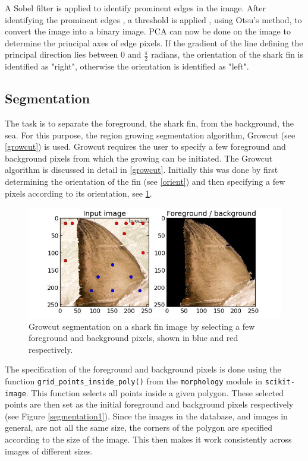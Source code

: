 \documentclass[a4paper,10pt]{article}
\begin{document}
A Sobel filter is applied 
to identify prominent edges in the image.  After identifying the prominent edges
, a threshold is applied , using Otsu's method, to convert the image into a binary image.
PCA can now be done on
the image to determine the principal axes of edge pixels.  If the gradient
of the line defining the principal direction lies between 0 and
$\frac{\pi}{2}$ radians, the orientation of the shark fin is
identified as
"right", otherwise the orientation is identified as "left". 

\subsection{Segmentation}
\label{segmentation}
The task is to separate the foreground, the shark fin, from the background,
the sea.  For this purpose, the region growing segmentation algorithm,
Growcut (see \ref{growcut}) is used.  Growcut requires the user to specify a few
foreground and background pixels from which the growing can be
initiated. The Growcut
  algorithm is discussed in detail in \ref{growcut}.
Initially this was done by first determining the orientation of the fin (see
\ref{orient}) and then specifying a few pixels according to its orientation, see 
\ref{segmentation}.  \\

\begin{figure}[H]
 \centering
 \includegraphics[width=5in]{segmentation.jpg}
 \caption{Growcut segmentation on a shark fin image by selecting a few
foreground and background pixels, shown in blue and red respectively.}
 \label{segmentation}
\end{figure}

The specification of
the foreground and background pixels is done using the function
\texttt{grid\_points\_inside\_poly()}\cite{scikit} from the \texttt{morphology} module in
\texttt{scikit-image}.  This function selects all points inside a given
polygon.  These selected  points are then set as the initial foreground and background pixels
respectively (see
Figure \ref{segmentation1}).
Since the images in the database, and images in general, are not
all the same size, the corners of the polygon are specified according to the size
of the image.  This then makes it work consistently across images of different sizes.  \\
\end{document}
